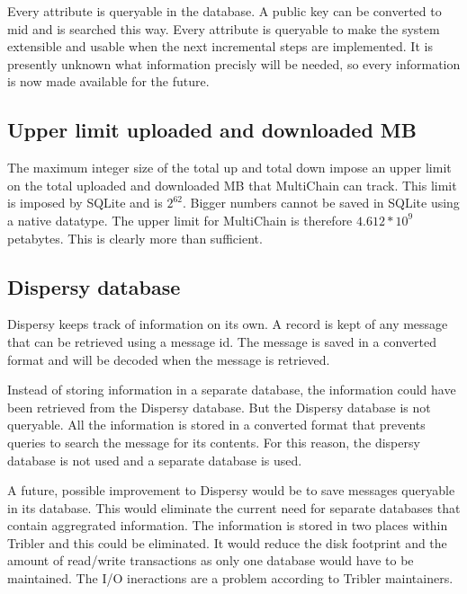 Every attribute is queryable in the database.
A public key can be converted to mid and is searched this way.
Every attribute is queryable to make the system  extensible
and usable when the next incremental steps are implemented.
It is presently unknown what information precisly will be needed,
so every information is now made available for the future.

\subsection{Upper limit uploaded and downloaded MB}
The maximum integer size of the total up and total down impose an upper limit
on the total uploaded and downloaded MB that MultiChain can track.
This limit is imposed by SQLite and is $2^{62}$.
Bigger numbers cannot be saved in SQLite using a native datatype.
The upper limit for MultiChain is therefore $4.612 * 10^9$ petabytes.
This is clearly more than sufficient.

\subsection{Dispersy database}
Dispersy keeps track of information on its own.
A record is kept of any message that can be retrieved using a message id.
The message is saved in a converted format and will be decoded when the message is retrieved.

Instead of storing information in a separate database,
the information could have been retrieved from the Dispersy database.
But the Dispersy database is not queryable.
All the information is stored in a converted format
that prevents queries to search the message for its contents.
For this reason, the dispersy database is not used and a separate database is used.

A future, possible improvement to Dispersy would be to save messages queryable in its database.
This would eliminate the current need for separate databases that contain aggregrated information.
The information is stored in two places within Tribler and this could be eliminated.
It would reduce the disk footprint and the amount of read/write transactions
as only one database would have to be maintained.
The I/O ineractions are a problem according to Tribler maintainers.